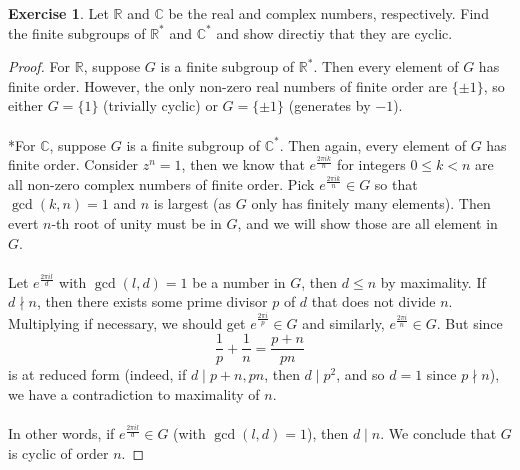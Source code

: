 \documentclass{article}
\theoremstyle{definition}
\newtheorem{exercise}{Exercise}
\begin{document}
\begin{exercise}
Let $\mathbb{R}$ and $\mathbb{C}$ be the real and complex numbers, respectively. Find the finite subgroups of $\mathbb{R}^*$ and $\mathbb{C}^*$ and show directiy that they are cyclic.
\end{exercise}
\begin{proof}
For $\mathbb{R}$, suppose $G$ is a finite subgroup of $\mathbb{R}^*$. Then every element of $G$ has finite order. However, the only non-zero real numbers of finite order are $\{ \pm 1 \}$, so either $G = \{ 1 \}$ (trivially cyclic) or $G = \{ \pm 1 \}$ (generates by $-1$).
\\
\\
*For $\mathbb{C}$, suppose $G$ is a finite subgroup of $\mathbb{C}^*$. Then again, every element of $G$ has finite order. Consider $z^n = 1$, then we know that $e^{\frac{2 \pi i k}{n}}$ for integers $0 \leq k < n$ are all non-zero complex numbers of finite order. Pick $e^{\frac{2 \pi i k}{n}} \in G$ so that $\gcd(k, n) = 1$ and $n$ is largest (as $G$ only has finitely many elements). Then evert $n$-th root of unity must be in $G$, and we will show those are all element in $G$.
\\
\\
Let $e^{\frac{2 \pi i l}{d}}$ with $\gcd(l, d) = 1$ be a number in $G$, then $d \leq n$ by maximality. If $d \nmid n$, then there exists some prime divisor $p$ of $d$ that does not divide $n$. Multiplying if necessary, we should get $e^{\frac{2 \pi i}{p}} \in G$ and similarly, $e^{\frac{2 \pi i}{n}} \in G$. But since
$$\frac{1}{p} + \frac{1}{n} = \frac{p + n}{pn}$$
is at reduced form (indeed, if $d \mid p + n, pn$, then $d \mid p^2$, and so $d = 1$ since $p \nmid n$), we have a contradiction to maximality of $n$.
\\
\\
In other words, if $e^{\frac{2 \pi i l}{d}} \in G$ (with $\gcd(l, d) = 1$), then $d \mid n$. We conclude that $G$ is cyclic of order $n$.
\end{proof}

\newpage
\end{document}
